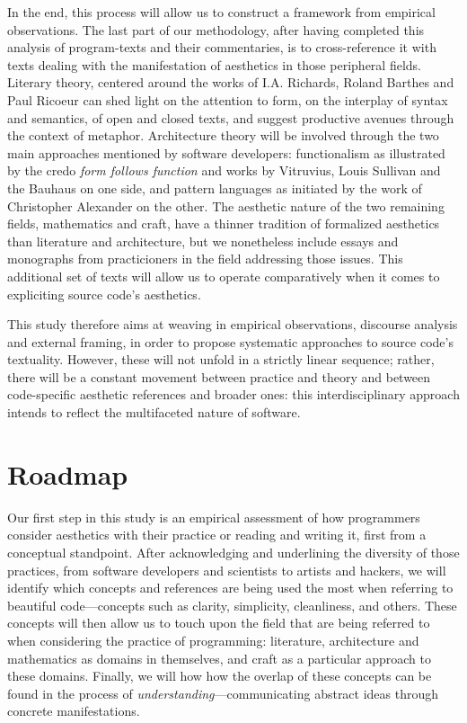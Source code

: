 In the end, this process will allow us to construct a framework from empirical observations. The last part of our methodology, after having completed this analysis of program-texts and their commentaries, is to cross-reference it with texts dealing with the manifestation of aesthetics in those peripheral fields. Literary theory, centered around the works of I.A. Richards, Roland Barthes and Paul Ricoeur can shed light on the attention to form, on the interplay of syntax and semantics, of open and closed texts, and suggest productive avenues through the context of metaphor. Architecture theory will be involved through the two main approaches mentioned by software developers: functionalism as illustrated by the credo \emph{form follows function} and works by Vitruvius, Louis Sullivan and the Bauhaus on one side, and pattern languages as initiated by the work of Christopher Alexander on the other. The aesthetic nature of the two remaining fields, mathematics and craft, have a thinner tradition of formalized aesthetics than literature and architecture, but we nonetheless include essays and monographs from practicioners in the field addressing those issues. This additional set of texts will allow us to operate comparatively when it comes to expliciting source code's aesthetics.

This study therefore aims at weaving in empirical observations, discourse analysis and external framing, in order to propose systematic approaches to source code's textuality. However, these will not unfold in a strictly linear sequence; rather, there will be a constant movement between practice and theory and between code-specific aesthetic references and broader ones: this interdisciplinary approach intends to reflect the multifaceted nature of software.

\section{Roadmap}

Our first step in this study is an empirical assessment of how programmers consider aesthetics with their practice or reading and writing it, first from a conceptual standpoint. After acknowledging and underlining the diversity of those practices, from software developers and scientists to artists and hackers, we will identify which concepts and references are being used the most when referring to beautiful code—concepts such as clarity, simplicity, cleanliness, and others. These concepts will then allow us to touch upon the field that are being referred to when considering the practice of programming: literature, architecture and mathematics as domains in themselves, and craft as a particular approach to these domains. Finally, we will how how the overlap of these concepts can be found in the process of \emph{understanding}—communicating abstract ideas through concrete manifestations.

